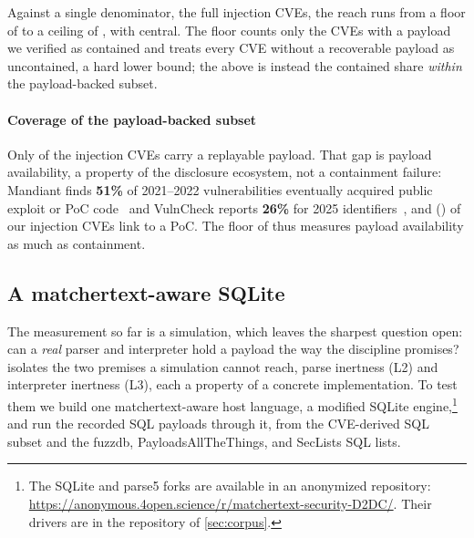 Against a single denominator, the full \dataInjectionCVEs injection CVEs, the reach
runs from a floor of \textbf{\dataFloorShare} to a ceiling of
\textbf{\dataHostableShare}, with \dataCentralShare central. The floor counts only
the \dataContained CVEs with a payload we verified as contained and treats every
CVE without a recoverable payload as uncontained, a hard lower bound; the
\dataContainedShare above is instead the contained share \emph{within} the
payload-backed subset.

\paragraph{Coverage of the payload-backed subset}
Only \dataPayloadBackedCVEs of the \dataInjectionCVEs injection CVEs carry a
replayable payload. That gap is
payload availability, a property of the disclosure ecosystem, not a containment
failure: Mandiant finds \textbf{51\%} of 2021--2022 vulnerabilities eventually
acquired public exploit or PoC code~\cite{mandiant23tte} and VulnCheck reports
\textbf{26\%} for 2025 identifiers~\cite{vulncheck26exploit}, and
\dataInjectionWithPoc (\dataInjectionWithPocShare) of our injection CVEs link to a
PoC. The floor of \dataFloorShare thus measures payload availability as much as
containment.

\subsection{A matchertext-aware SQLite}
\label{sec:prevent:exec}

The measurement so far is a simulation, which leaves the sharpest question open:
can a \emph{real} parser and interpreter hold a payload the way the discipline
promises?
 isolates the two premises a simulation cannot reach, parse
inertness (L2) and interpreter inertness (L3), each a property of a concrete
implementation.
To test them we build one matchertext-aware host language, a modified SQLite
engine,\footnote{The SQLite and parse5 forks are available in an anonymized
repository: \url{https://anonymous.4open.science/r/matchertext-security-D2DC/}.
Their drivers are in the repository of \cref{sec:corpus}.} and run the
recorded SQL payloads through it, from the CVE-derived SQL subset and the
fuzzdb, PayloadsAllTheThings, and SecLists SQL lists.

